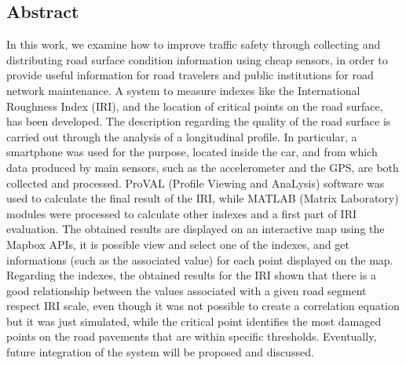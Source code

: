 \documentclass[tesi]{subfiles}
\begin{document}
\begin{flushright}
\section*{Abstract}\label{Abstract}

\vspace{10mm}
\end{flushright}
\noindent In this work, we examine how to improve traffic safety through collecting and distributing road surface condition information using cheap sensors, in order to provide useful information for road travelers and public institutions for road network maintenance. A system to measure indexes like the International Roughness Index (IRI), and the location of critical points on the road surface, has been developed. The description regarding the quality of the road surface is carried out through the analysis of a longitudinal profile. In particular, a smartphone was used for the purpose, located inside the car, and from which data produced by main sensors, such as the accelerometer and the GPS, are both collected and processed. ProVAL (Profile Viewing and AnaLysis) software was used to calculate the final result of the IRI, while MATLAB (Matrix Laboratory) modules were processed to calculate other indexes and a first part of IRI evaluation. The obtained results are displayed on an interactive map using the Mapbox APIs, it is possible view and select one of the indexes, and get informations (such as the associated value) for each point displayed on the map. Regarding the indexes, the obtained results for the IRI shown that there is a good relationship between the values associated with a given road segment respect IRI scale, even though it was not possible to create a correlation equation but it was just simulated, while the critical point identifies the most damaged points on the road pavements that are within specific thresholds. Eventually, future integration of the system will be proposed and discussed.
\clearpage
\end{document}
